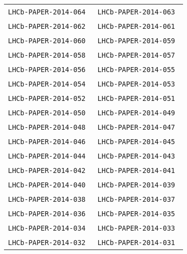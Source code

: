 \begin{center}
\begin{longtable}{ll}
\texttt{LHCb-PAPER-2014-064}~\cite{LHCb-PAPER-2014-064} &
\texttt{LHCb-PAPER-2014-063}~\cite{LHCb-PAPER-2014-063} \\
\texttt{LHCb-PAPER-2014-062}~\cite{LHCb-PAPER-2014-062} &
\texttt{LHCb-PAPER-2014-061}~\cite{LHCb-PAPER-2014-061} \\
\texttt{LHCb-PAPER-2014-060}~\cite{LHCb-PAPER-2014-060} &
\texttt{LHCb-PAPER-2014-059}~\cite{LHCb-PAPER-2014-059} \\
\texttt{LHCb-PAPER-2014-058}~\cite{LHCb-PAPER-2014-058} &
\texttt{LHCb-PAPER-2014-057}~\cite{LHCb-PAPER-2014-057} \\
\texttt{LHCb-PAPER-2014-056}~\cite{LHCb-PAPER-2014-056} &
\texttt{LHCb-PAPER-2014-055}~\cite{LHCb-PAPER-2014-055} \\
\texttt{LHCb-PAPER-2014-054}~\cite{LHCb-PAPER-2014-054} &
\texttt{LHCb-PAPER-2014-053}~\cite{LHCb-PAPER-2014-053} \\
\texttt{LHCb-PAPER-2014-052}~\cite{LHCb-PAPER-2014-052} &
\texttt{LHCb-PAPER-2014-051}~\cite{LHCb-PAPER-2014-051} \\
\texttt{LHCb-PAPER-2014-050}~\cite{LHCb-PAPER-2014-050} &
\texttt{LHCb-PAPER-2014-049}~\cite{LHCb-PAPER-2014-049} \\
\texttt{LHCb-PAPER-2014-048}~\cite{LHCb-PAPER-2014-048} &
\texttt{LHCb-PAPER-2014-047}~\cite{LHCb-PAPER-2014-047} \\
\texttt{LHCb-PAPER-2014-046}~\cite{LHCb-PAPER-2014-046} &
\texttt{LHCb-PAPER-2014-045}~\cite{LHCb-PAPER-2014-045} \\
\texttt{LHCb-PAPER-2014-044}~\cite{LHCb-PAPER-2014-044} &
\texttt{LHCb-PAPER-2014-043}~\cite{LHCb-PAPER-2014-043} \\
\texttt{LHCb-PAPER-2014-042}~\cite{LHCb-PAPER-2014-042} &
\texttt{LHCb-PAPER-2014-041}~\cite{LHCb-PAPER-2014-041} \\
\texttt{LHCb-PAPER-2014-040}~\cite{LHCb-PAPER-2014-040} &
\texttt{LHCb-PAPER-2014-039}~\cite{LHCb-PAPER-2014-039} \\
\texttt{LHCb-PAPER-2014-038}~\cite{LHCb-PAPER-2014-038} &
\texttt{LHCb-PAPER-2014-037}~\cite{LHCb-PAPER-2014-037} \\
\texttt{LHCb-PAPER-2014-036}~\cite{LHCb-PAPER-2014-036} &
\texttt{LHCb-PAPER-2014-035}~\cite{LHCb-PAPER-2014-035} \\
\texttt{LHCb-PAPER-2014-034}~\cite{LHCb-PAPER-2014-034} &
\texttt{LHCb-PAPER-2014-033}~\cite{LHCb-PAPER-2014-033} \\
\texttt{LHCb-PAPER-2014-032}~\cite{LHCb-PAPER-2014-032} &
\texttt{LHCb-PAPER-2014-031}~\cite{LHCb-PAPER-2014-031} \\

\end{longtable}
\end{center}
